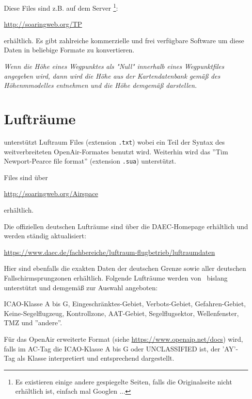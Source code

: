 Diese Files sind z.B. auf dem Server \footnote{Es existieren einige andere gespiegelte Seiten, falls die
Originalseite nicht erhältlich ist, einfach mal Googlen ...}:
\begin{center}
\url{http://soaringweb.org/TP}
\end{center}
erhältlich. Es gibt zahlreiche kommerzielle und frei verfügbare Software um diese Daten in beliebige Formate zu
konvertieren.

\achtung \textsl{Wenn die Höhe eines Wegpunktes als "Null" innerhalb eines Wegpunktfiles angegeben
wird, dann wird  \xc  die Höhe aus der Kartendatenbank gemäß des Höhenmmodelles entnehmen und die
Höhe demgemäß darstellen.}


\section{Lufträume}

\xc unterstützt Luftraum Files (extension \verb|.txt|) wobei ein Teil der Syntax
des weitverbreiteten OpenAir-Formates benutzt wird. Weiterhin wird das ''Tim Newport-Pearce file format''
(extension \verb|.sua|) unterstützt.

Files sind über
\begin{center}
\url{http://soaringweb.org/Airspace}
\end{center}
 erhältlich.

Die offiziellen deutschen Lufträume sind über die DAEC-Homepage erhältlich und werden ständig
aktualisiert:
\begin{center}
\url{https://www.daec.de/fachbereiche/luftraum-flugbetrieb/luftraumdaten}
\end{center}

Hier sind ebenfalls die exakten Daten der deutschen Grenze sowie aller deutschen Fallschirmsprungzonen
erhältlich. Folgende Lufträume werden von \xc~bislang unterstützt und demgemäß zur Auswahl angeboten:

ICAO-Klasse A bis G, Eingeschränktes-Gebiet, Verbots-Gebiet, Gefahren-Gebiet, Keine-Segelflugzeug, Kontrollzone,
AAT-Gebiet, Segelflugsektor, Wellenfenster, TMZ und
''andere''.

Für das OpenAir erweiterte Format (siehe \url{https://www.openaip.net/docs}) wird, falls im AC-Tag die ICAO-Klasse
A bis G oder UNCLASSIFIED ist, der 'AY'-Tag als Klasse interpretiert und entsprechend dargestellt.

